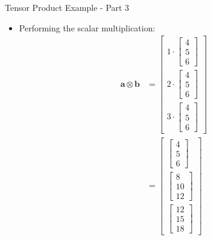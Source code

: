 \documentclass{beamer}
\begin{document}
\begin{frame}{Tensor Product Example - Part 3}
\begin{itemize}
\item Performing the scalar multiplication:
\begin{align*}
\mathbf{a} \otimes \mathbf{b} &= \begin{bmatrix} 1 \cdot \begin{bmatrix} 4 \\ 5 \\ 6 \end{bmatrix} \\ 2 \cdot \begin{bmatrix} 4 \\ 5 \\ 6 \end{bmatrix} \\ 3 \cdot \begin{bmatrix} 4 \\ 5 \\ 6 \end{bmatrix} \end{bmatrix} \\
&= \begin{bmatrix} \begin{bmatrix} 4 \\ 5 \\ 6 \end{bmatrix} \\ \begin{bmatrix} 8 \\ 10 \\ 12 \end{bmatrix} \\ \begin{bmatrix} 12 \\ 15 \\ 18 \end{bmatrix} \end{bmatrix}
\end{align*}
\end{itemize}
\end{frame}
\end{document}
